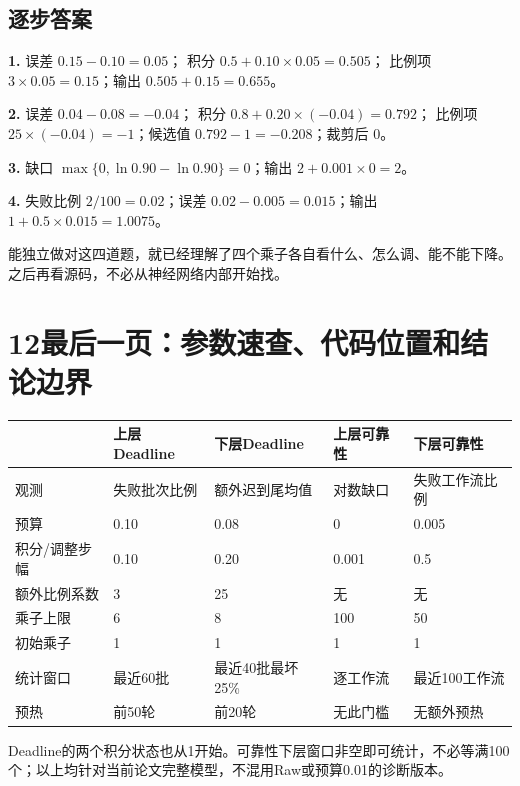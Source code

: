 \documentclass[UTF8,11pt,a4paper,fontset=fandol]{ctexart}
\newcommand{\lesson}[2]{\section*{#1\quad #2}}
\begin{document}
\subsection*{逐步答案}
\textbf{1.} 误差 $0.15-0.10=0.05$；
积分 $0.5+0.10\times0.05=0.505$；
比例项 $3\times0.05=0.15$；输出 $0.505+0.15=\boxed{0.655}$。

\textbf{2.} 误差 $0.04-0.08=-0.04$；
积分 $0.8+0.20\times(-0.04)=0.792$；
比例项 $25\times(-0.04)=-1$；候选值 $0.792-1=-0.208$；裁剪后 $\boxed{0}$。

\textbf{3.} 缺口 $\max\{0,\ln0.90-\ln0.90\}=0$；输出 $2+0.001\times0=\boxed{2}$。

\textbf{4.} 失败比例 $2/100=0.02$；误差 $0.02-0.005=0.015$；输出 $1+0.5\times0.015=\boxed{1.0075}$。

\begin{remember}
能独立做对这四道题，就已经理解了四个乘子各自看什么、怎么调、能不能下降。之后再看源码，不必从神经网络内部开始找。
\end{remember}

\newpage
\lesson{12}{最后一页：参数速查、代码位置和结论边界}
\begingroup\small
\linespread{1.02}\selectfont
\setlength{\parskip}{3pt}
\renewcommand{\arraystretch}{1.15}
\begin{center}
\begin{tabularx}{\linewidth}{@{}lXXXX@{}}
\toprule
 & 上层Deadline & 下层Deadline & 上层可靠性 & 下层可靠性\\\midrule
观测 & 失败批次比例 & 额外迟到尾均值 & 对数缺口 & 失败工作流比例\\
预算 & 0.10 & 0.08 & 0 & 0.005\\
积分/调整步幅 & 0.10 & 0.20 & 0.001 & 0.5\\
额外比例系数 & 3 & 25 & 无 & 无\\
乘子上限 & 6 & 8 & 100 & 50\\
初始乘子 & 1 & 1 & 1 & 1\\
统计窗口 & 最近60批 & 最近40批最坏25\% & 逐工作流 & 最近100工作流\\
预热 & 前50轮 & 前20轮 & 无此门槛 & 无额外预热\\\bottomrule
\end{tabularx}
\end{center}
Deadline的两个积分状态也从1开始。可靠性下层窗口非空即可统计，不必等满100个；以上均针对当前论文完整模型，不混用Raw或预算0.01的诊断版本。
\end{document}
